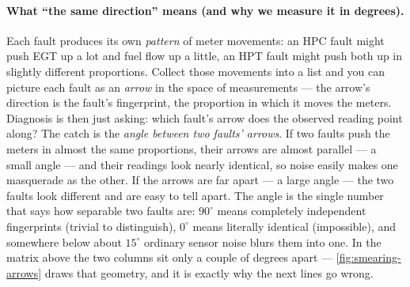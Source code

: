 \paragraph{What ``the same direction'' means (and why we measure it in degrees).} Each fault
produces its own \emph{pattern} of meter movements: an HPC fault might push EGT up a lot and
fuel flow up a little, an HPT fault might push both up in slightly different proportions.
Collect those movements into a list and you can picture each fault as an \emph{arrow} in the
space of measurements --- the arrow's direction is the fault's fingerprint, the proportion in
which it moves the meters. Diagnosis is then just asking: which fault's arrow does the
observed reading point along? The catch is the \emph{angle between two faults' arrows}. If
two faults push the meters in almost the same proportions, their arrows are almost parallel
--- a small angle --- and their readings look nearly identical, so noise easily makes one
masquerade as the other. If the arrows are far apart --- a large angle --- the two faults look
different and are easy to tell apart. The angle is the single number that says how separable
two faults are: $90^{\circ}$ means completely independent fingerprints (trivial to
distinguish), $0^{\circ}$ means literally identical (impossible), and somewhere below about
$15^{\circ}$ ordinary sensor noise blurs them into one. In the matrix above the two columns
sit only a couple of degrees apart --- \cref{fig:smearing-arrows} draws that geometry, and it
is exactly why the next lines go wrong.

